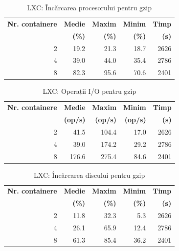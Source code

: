 \begin{table}[ht]
  \centering
  \begin{tabular}{@{}rrrrr@{}}
    \toprule
    \textbf{Nr. containere} & \textbf{Medie} & \textbf{Maxim} &
    \textbf{Minim} & \textbf{Timp} \\
    & \textbf{(\%)} & \textbf{(\%)} & \textbf{(\%)} &\textbf{(s)} \\
    \midrule
    2 & 19.2 & 21.3 & 18.7 & 2626 \\
    4 & 39.0 & 44.0 & 35.4 & 2786 \\
    8 & 82.3 & 95.6 & 70.6 & 2401 \\
    \bottomrule
  \end{tabular}
  \caption{LXC: Încărcarea procesorului pentru gzip}
  \label{table:virt-infra:lxc-cpu}
\end{table}

\begin{table}[ht]
  \centering
  \begin{tabular}{@{}rrrrr@{}}
    \toprule
    \textbf{Nr. containere} & \textbf{Medie} & \textbf{Maxim} &
    \textbf{Minim} & \textbf{Timp} \\
    & \textbf{(op/s)} & \textbf{(op/s)} & \textbf{(op/s)} &\textbf{(s)} \\
    \midrule
    2 & 41.5 & 104.4 & 17.0 & 2626 \\
    4 & 39.0 & 174.2 & 29.2 & 2786 \\
    8 & 176.6 & 275.4 & 84.6 & 2401 \\
    \bottomrule
  \end{tabular}
  \caption{LXC: Operații I/O pentru gzip}
  \label{table:virt-infra:lxc-io}
\end{table}

\begin{table}[ht]
  \centering
  \begin{tabular}{@{}rrrrr@{}}
    \toprule
    \textbf{Nr. containere} & \textbf{Medie} & \textbf{Maxim} &
    \textbf{Minim} & \textbf{Timp} \\
    & \textbf{(\%)} & \textbf{(\%)} & \textbf{(\%)} &\textbf{(s)} \\
    \midrule
    2 & 11.8 & 32.3 & 5.3 & 2626 \\
    4 & 26.1 & 65.9 & 12.4 & 2786 \\
    8 & 61.3 & 85.4 & 36.2 & 2401 \\
    \bottomrule
  \end{tabular}
  \caption{LXC: Încărcarea discului pentru gzip}
  \label{table:virt-infra:lxc-disk}
\end{table}

